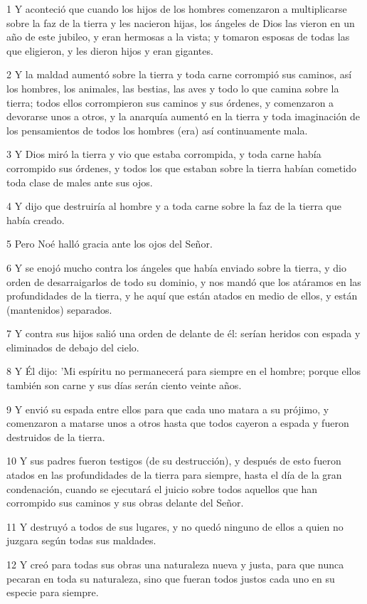 \par 1 Y aconteció que cuando los hijos de los hombres comenzaron a multiplicarse sobre la faz de la tierra y les nacieron hijas, los ángeles de Dios las vieron en un año de este jubileo, y eran hermosas a la vista; y tomaron esposas de todas las que eligieron, y les dieron hijos y eran gigantes.
\par 2 Y la maldad aumentó sobre la tierra y toda carne corrompió sus caminos, así los hombres, los animales, las bestias, las aves y todo lo que camina sobre la tierra; todos ellos corrompieron sus caminos y sus órdenes, y comenzaron a devorarse unos a otros, y la anarquía aumentó en la tierra y toda imaginación de los pensamientos de todos los hombres (era) así continuamente mala.
\par 3 Y Dios miró la tierra y vio que estaba corrompida, y toda carne había corrompido sus órdenes, y todos los que estaban sobre la tierra habían cometido toda clase de males ante sus ojos.
\par 4 Y dijo que destruiría al hombre y a toda carne sobre la faz de la tierra que había creado.
\par 5 Pero Noé halló gracia ante los ojos del Señor.
\par 6 Y se enojó mucho contra los ángeles que había enviado sobre la tierra, y dio orden de desarraigarlos de todo su dominio, y nos mandó que los atáramos en las profundidades de la tierra, y he aquí que están atados en medio de ellos, y están (mantenidos) separados.
\par 7 Y contra sus hijos salió una orden de delante de él: serían heridos con espada y eliminados de debajo del cielo.
\par 8 Y Él dijo: 'Mi espíritu no permanecerá para siempre en el hombre; porque ellos también son carne y sus días serán ciento veinte años.
\par 9 Y envió su espada entre ellos para que cada uno matara a su prójimo, y comenzaron a matarse unos a otros hasta que todos cayeron a espada y fueron destruidos de la tierra.
\par 10 Y sus padres fueron testigos (de su destrucción), y después de esto fueron atados en las profundidades de la tierra para siempre, hasta el día de la gran condenación, cuando se ejecutará el juicio sobre todos aquellos que han corrompido sus caminos y sus obras delante del Señor.
\par 11 Y destruyó a todos de sus lugares, y no quedó ninguno de ellos a quien no juzgara según todas sus maldades.
\par 12 Y creó para todas sus obras una naturaleza nueva y justa, para que nunca pecaran en toda su naturaleza, sino que fueran todos justos cada uno en su especie para siempre.
